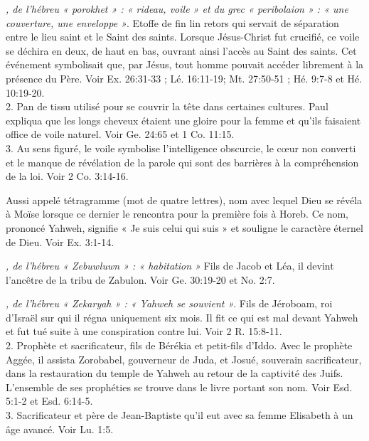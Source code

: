 \begin{multicols}{2}
{\textit{, de l'hébreu « porokhet » : « rideau, voile » et du grec « peribolaion » : « une couverture, une enveloppe »}. Etoffe de fin lin retors qui servait de séparation entre le lieu saint et le Saint des saints. Lorsque Jésus-Christ fut crucifié, ce voile se déchira en deux, de haut en bas, ouvrant ainsi l'accès au Saint des saints. Cet événement symbolisait que, par Jésus, tout homme pouvait accéder librement à la présence du Père. Voir Ex. 26:31-33 ; Lé. 16:11-19; Mt. 27:50-51 ; Hé. 9:7-8 et Hé. 10:19-20.
\\2. Pan de tissu utilisé pour se couvrir la tête dans certaines cultures. Paul expliqua que les longs cheveux étaient une gloire pour la femme et qu'ils faisaient office de voile naturel. Voir Ge. 24:65 et 1 Co. 11:15.
\\3. Au sens figuré, le voile symbolise l'intelligence obscurcie, le cœur non converti et le manque de révélation de la parole qui sont des barrières à la compréhension de la loi. Voir 2 Co. 3:14-16.

\textit{}\newline
Aussi appelé tétragramme (mot de quatre lettres), nom avec lequel Dieu se révéla à Moïse lorsque ce dernier le rencontra pour la première fois à Horeb. Ce nom, prononcé Yahweh, signifie « Je suis celui qui suis » et souligne le caractère éternel de Dieu. Voir Ex. 3:1-14.

\textit{, de l'hébreu « Zebuwluwn » : « habitation »}\newline
Fils de Jacob et Léa, il devint l'ancêtre de la tribu de Zabulon. Voir Ge. 30:19-20 et No. 2:7.

\textit{, de l'hébreu « Zekaryah » : « Yahweh se souvient »}. Fils de Jéroboam, roi d'Israël sur qui il régna uniquement six mois. Il fit ce qui est mal devant Yahweh et fut tué suite à une conspiration contre lui. Voir 2 R. 15:8-11.
\\2. Prophète et sacrificateur, fils de Bérékia et petit-fils d'Iddo. Avec le prophète Aggée, il assista Zorobabel, gouverneur de Juda, et Josué, souverain sacrificateur, dans la restauration du temple de Yahweh au retour de la captivité des Juifs. L'ensemble de ses prophéties se trouve dans le livre portant son nom. Voir Esd. 5:1-2 et Esd. 6:14-5.
\\3. Sacrificateur et père de Jean-Baptiste qu'il eut avec sa femme Elisabeth à un âge avancé. Voir Lu. 1:5.

}
\end{multicols}
